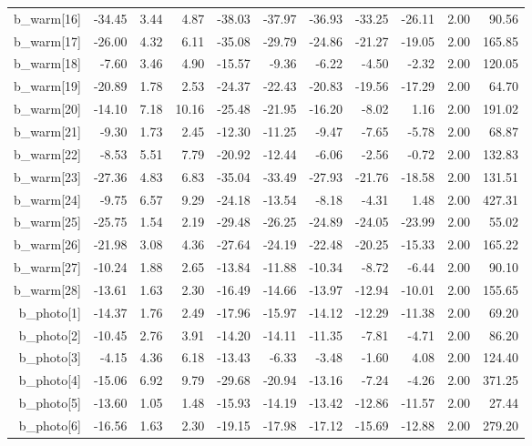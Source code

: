 \documentclass[11pt]{article}
\begin{document}
\begin{table}[ht]
\begin{tabular}{rrrrrrrrrrr}
  b\_warm[16] & -34.45 & 3.44 & 4.87 & -38.03 & -37.97 & -36.93 & -33.25 & -26.11 & 2.00 & 90.56 \\ 
  b\_warm[17] & -26.00 & 4.32 & 6.11 & -35.08 & -29.79 & -24.86 & -21.27 & -19.05 & 2.00 & 165.85 \\ 
  b\_warm[18] & -7.60 & 3.46 & 4.90 & -15.57 & -9.36 & -6.22 & -4.50 & -2.32 & 2.00 & 120.05 \\ 
  b\_warm[19] & -20.89 & 1.78 & 2.53 & -24.37 & -22.43 & -20.83 & -19.56 & -17.29 & 2.00 & 64.70 \\ 
  b\_warm[20] & -14.10 & 7.18 & 10.16 & -25.48 & -21.95 & -16.20 & -8.02 & 1.16 & 2.00 & 191.02 \\ 
  b\_warm[21] & -9.30 & 1.73 & 2.45 & -12.30 & -11.25 & -9.47 & -7.65 & -5.78 & 2.00 & 68.87 \\ 
  b\_warm[22] & -8.53 & 5.51 & 7.79 & -20.92 & -12.44 & -6.06 & -2.56 & -0.72 & 2.00 & 132.83 \\ 
  b\_warm[23] & -27.36 & 4.83 & 6.83 & -35.04 & -33.49 & -27.93 & -21.76 & -18.58 & 2.00 & 131.51 \\ 
  b\_warm[24] & -9.75 & 6.57 & 9.29 & -24.18 & -13.54 & -8.18 & -4.31 & 1.48 & 2.00 & 427.31 \\ 
  b\_warm[25] & -25.75 & 1.54 & 2.19 & -29.48 & -26.25 & -24.89 & -24.05 & -23.99 & 2.00 & 55.02 \\ 
  b\_warm[26] & -21.98 & 3.08 & 4.36 & -27.64 & -24.19 & -22.48 & -20.25 & -15.33 & 2.00 & 165.22 \\ 
  b\_warm[27] & -10.24 & 1.88 & 2.65 & -13.84 & -11.88 & -10.34 & -8.72 & -6.44 & 2.00 & 90.10 \\ 
  b\_warm[28] & -13.61 & 1.63 & 2.30 & -16.49 & -14.66 & -13.97 & -12.94 & -10.01 & 2.00 & 155.65 \\ 
  b\_photo[1] & -14.37 & 1.76 & 2.49 & -17.96 & -15.97 & -14.12 & -12.29 & -11.38 & 2.00 & 69.20 \\ 
  b\_photo[2] & -10.45 & 2.76 & 3.91 & -14.20 & -14.11 & -11.35 & -7.81 & -4.71 & 2.00 & 86.20 \\ 
  b\_photo[3] & -4.15 & 4.36 & 6.18 & -13.43 & -6.33 & -3.48 & -1.60 & 4.08 & 2.00 & 124.40 \\ 
  b\_photo[4] & -15.06 & 6.92 & 9.79 & -29.68 & -20.94 & -13.16 & -7.24 & -4.26 & 2.00 & 371.25 \\ 
  b\_photo[5] & -13.60 & 1.05 & 1.48 & -15.93 & -14.19 & -13.42 & -12.86 & -11.57 & 2.00 & 27.44 \\ 
  b\_photo[6] & -16.56 & 1.63 & 2.30 & -19.15 & -17.98 & -17.12 & -15.69 & -12.88 & 2.00 & 279.20 \\ 

\end{tabular}
\end{table}
\end{document}
